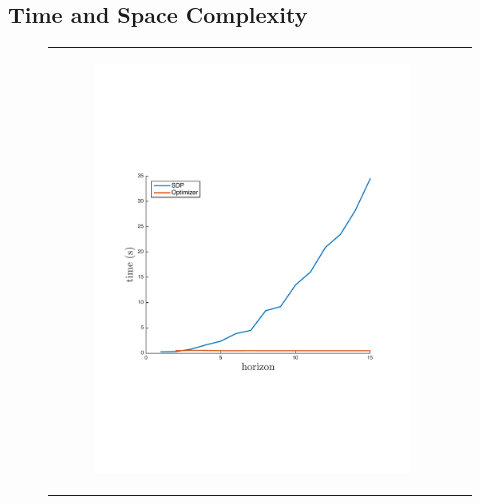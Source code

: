 \subsection{Time and Space Complexity}

    \begin{figure}[ht]
        \begin{tabular}{cc}
            \begin{subfigure}[b]{0.24\textwidth}\centering \includegraphics[width=\textwidth]{images/time_plot_new}
                \label{fig:time_complexity}\end{subfigure}\hspace{-1em}

\end{tabular}
\end{figure}
